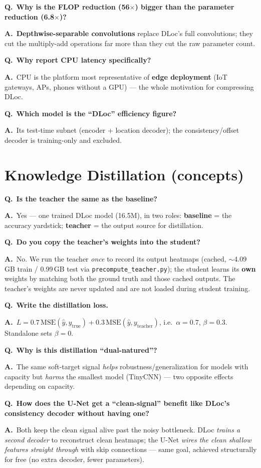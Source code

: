 \documentclass[11pt]{article}
\newcommand{\Q}[1]{\medskip\noindent\textbf{\textcolor{blue!50!black}{Q.}}\ \textbf{#1}\par\nopagebreak}
\newcommand{\A}{\noindent\textbf{A.}\ }
\begin{document}
\Q{Why is the FLOP reduction (56$\times$) bigger than the parameter reduction (6.8$\times$)?}
\A \textbf{Depthwise-separable convolutions} replace DLoc's full convolutions; they cut the multiply-add
operations far more than they cut the raw parameter count.

\Q{Why report CPU latency specifically?}
\A CPU is the platform most representative of \textbf{edge deployment} (IoT gateways, APs, phones without
a GPU) --- the whole motivation for compressing DLoc.

\Q{Which model is the ``DLoc'' efficiency figure?}
\A Its test-time subnet (encoder + location decoder); the consistency/offset decoder is training-only and
excluded.

\section{Knowledge Distillation (concepts)}

\Q{Is the teacher the same as the baseline?}
\A Yes --- one trained DLoc model (16.5M), in two roles: \textbf{baseline} = the accuracy yardstick;
\textbf{teacher} = the output source for distillation.

\Q{Do you copy the teacher's weights into the student?}
\A No. We run the teacher \emph{once} to record its output heatmaps (cached, $\sim$4.09\,GB train /
0.99\,GB test via \texttt{precompute\_teacher.py}); the student learns its \textbf{own} weights by
matching both the ground truth and those cached outputs. The teacher's weights are never updated and are
not loaded during student training.

\Q{Write the distillation loss.}
\A $L = 0.7\,\mathrm{MSE}(\hat{y}, y_{\text{true}}) + 0.3\,\mathrm{MSE}(\hat{y}, y_{\text{teacher}})$,
i.e.\ $\alpha{=}0.7$, $\beta{=}0.3$. Standalone sets $\beta{=}0$.

\Q{Why is this distillation ``dual-natured''?}
\A The same soft-target signal \emph{helps} robustness/generalization for models with capacity but
\emph{harms} the smallest model (TinyCNN) --- two opposite effects depending on capacity.

\Q{How does the U-Net get a ``clean-signal'' benefit like DLoc's consistency decoder without having one?}
\A Both keep the clean signal alive past the noisy bottleneck. DLoc \emph{trains a second decoder} to
reconstruct clean heatmaps; the U-Net \emph{wires the clean shallow features straight through} with skip
connections --- same goal, achieved structurally for free (no extra decoder, fewer parameters).
\end{document}
